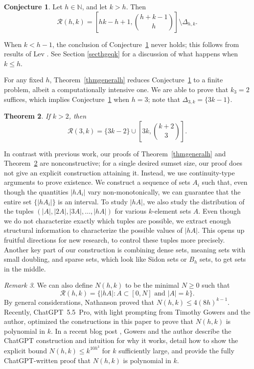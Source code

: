 \documentclass{daj}
\newtheorem{theorem}{Theorem}
\theoremstyle{definition}
\newtheorem{conjecture}[theorem]{Conjecture}
\theoremstyle{remark}
\newtheorem{remark}[theorem]{Remark}
\numberwithin{equation}{section}
\numberwithin{theorem}{section}
\newcommand{\N}{\mathbb{N}}
\newcommand{\calr}{\mathcal{R}}
\begin{document}
\begin{conjecture}\label{mainconj}
Let $h \in \N$, and let $k>h$. Then \[\calr(h,k) = \left[hk-h+1,\binom{h+k-1}{h}\right] \setminus \Delta_{h,k}.\]
\end{conjecture}

When $k < h-1$, the conclusion of Conjecture~\ref{mainconj} never holds; this follows from results of Lev \cite{Lev96}. See Section \ref{secthgeqk} for a discussion of what happens when $k \leq h$.

For any fixed $h$, Theorem~\ref{thmgeneralh} reduces Conjecture~\ref{mainconj} to a finite problem, albeit a computationally intensive one. We are able to prove that $k_3 = 2$ suffices, which implies Conjecture~\ref{mainconj} when $h = 3$; note that $\Delta_{3,k} = \{3k-1\}$.

\begin{theorem}\label{thmh3}
    If $k>2$, then \[\calr(3,k) = \{3k-2\} \cup \left[3k,\binom{k+2}{3}\right].\]
\end{theorem}

In contrast with previous work, our proofs of Theorem~\ref{thmgeneralh} and Theorem~\ref{thmh3} are nonconstructive; for a single desired sumset size, our proof does not give an explicit construction attaining it. Instead, we use continuity-type arguments to prove existence. We construct a sequence of sets $A_i$ such that, even though the quantities $|hA_{i}|$ vary non-monotonically, we can guarantee that the entire set $\{|hA_i|\}$ is an interval. To study $|hA|$, we also study the distribution of the tuples $(|A|, |2A|, |3A|,\ldots,|hA|)$ for various $k$-element sets $A$. Even though we do not characterize exactly which tuples are possible, we extract enough structural information to characterize the possible values of $|hA|$. This opens up fruitful directions for new research, to control these tuples more precisely. Another key part of our construction is combining dense sets, meaning sets with small doubling, and sparse sets, which look like Sidon sets or $B_h$ sets, to get sets in the middle. 

\begin{remark}
    We can also define $N(h,k)$ to be the minimal $N \geq 0$ such that \[\calr(h,k) = \{|hA|:A \subset [0,N] \text{ and }|A| = k\}.\] By general considerations, Nathanson \cite[Theorem 8]{nathanson2025compressioncomplexitysumsetsizes} proved that $N(h,k) \leq 4(8h)^{k-1}$. Recently, \mbox{ChatGPT 5.5 Pro}, with light prompting from Timothy Gowers and the author, optimized the constructions in this paper to prove that $N(h,k)$ is polynomial in $k$. In a recent blog post \cite{GR26}, Gowers and the author describe the ChatGPT construction and intuition for why it works, detail how to show the explicit bound $N(h,k) \leq k^{10h^3}$ for $k$ sufficiently large, and provide the fully ChatGPT-written proof that $N(h,k)$ is polynomial in $k$.
\end{remark}
\end{document}
